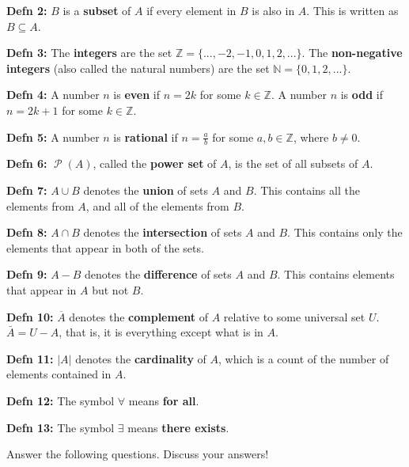 \documentclass[12pt,letterpaper]{article}
\newcommand\N{\mathbb N}
\newcommand\Z{\mathbb Z}
\newcommand\Pow{\ensuremath{\operatorname{\mathcal{P}}}}
\begin{document}
      \textbf{Defn 2:} $B$ is a \textbf{subset} of $A$ if every element in $B$ is also in $A$. This is written as $B \subseteq A$.

      \textbf{Defn 3:} The \textbf{integers} are the set $\Z = \{..., -2, -1, 0, 1, 2, ...\}$. The \textbf{non-negative integers} (also called the natural numbers) are the set $\N = \{0,1,2,...\}$.

      \textbf{Defn 4:} A number $n$ is \textbf{even} if $n = 2k$ for some $k \in \Z$. A number $n$ is \textbf{odd} if $n = 2k + 1$ for some $k \in \Z$.

      \textbf{Defn 5:} A number $n$ is \textbf{rational} if $n = \frac{a}{b}$ for some $a,b \in \Z$, where $b \neq 0$. 

	\textbf{Defn 6:} $\Pow{(A)}$, called the \textbf{power set} of $A$, is the set of all subsets of $A$.
	
	\textbf{Defn 7:} $A \cup B$ denotes the \textbf{union} of sets $A$ and $B$. This contains all the elements from $A$, and all of the elements from $B$. 
	
	\textbf{Defn 8:} $A \cap B$ denotes the \textbf{intersection} of sets $A$ and $B$. This contains only the elements that appear in both of the sets.
	
	\textbf{Defn 9:} $A - B$ denotes the \textbf{difference} of sets $A$ and $B$. This contains elements that appear in $A$ but not $B$.
	
	\textbf{Defn 10:} $\overline{A}$ denotes the \textbf{complement} of $A$ relative to some universal set $U$. $\bar{A} = U - A$, that is, it is everything except what is in $A$.
	
	\textbf{Defn 11:} $|A|$ denotes the \textbf{cardinality} of $A$, which is a count of the number of elements contained in $A$.
	
	\textbf{Defn 12:} The symbol $\forall$ means \textbf{for all}.
	
	\textbf{Defn 13:} The symbol $\exists$ means \textbf{there exists}.
	
	Answer the following questions. Discuss your answers!
\end{document}

